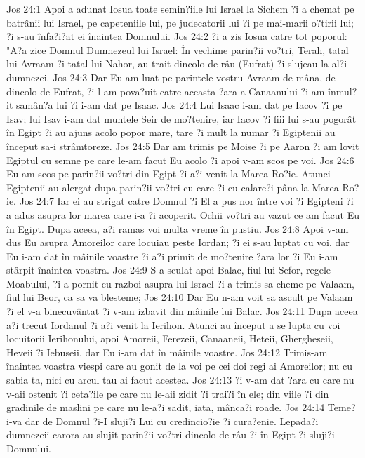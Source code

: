 Jos 24:1  Apoi a adunat Iosua toate semin?iile lui Israel la Sichem ?i a chemat pe batrânii lui Israel, pe capeteniile lui, pe judecatorii lui ?i pe mai-marii o?tirii lui; ?i s-au înfa?i?at ei înaintea Domnului.
Jos 24:2  ?i a zis Iosua catre tot poporul: "A?a zice Domnul Dumnezeul lui Israel: În vechime parin?ii vo?tri, Terah, tatal lui Avraam ?i tatal lui Nahor, au trait dincolo de râu (Eufrat) ?i slujeau la al?i dumnezei.
Jos 24:3  Dar Eu am luat pe parintele vostru Avraam de mâna, de dincolo de Eufrat, ?i l-am pova?uit catre aceasta ?ara a Canaanului ?i am înmul?it samân?a lui ?i i-am dat pe Isaac.
Jos 24:4  Lui Isaac i-am dat pe Iacov ?i pe Isav; lui Isav i-am dat muntele Seir de mo?tenire, iar Iacov ?i fiii lui s-au pogorât în Egipt ?i au ajuns acolo popor mare, tare ?i mult la numar ?i Egiptenii au început sa-i strâmtoreze.
Jos 24:5  Dar am trimis pe Moise ?i pe Aaron ?i am lovit Egiptul cu semne pe care le-am facut Eu acolo ?i apoi v-am scos pe voi.
Jos 24:6  Eu am scos pe parin?ii vo?tri din Egipt ?i a?i venit la Marea Ro?ie. Atunci Egiptenii au alergat dupa parin?ii vo?tri cu care ?i cu calare?i pâna la Marea Ro?ie.
Jos 24:7  Iar ei au strigat catre Domnul ?i El a pus nor între voi ?i Egipteni ?i a adus asupra lor marea care i-a ?i acoperit. Ochii vo?tri au vazut ce am facut Eu în Egipt. Dupa aceea, a?i ramas voi multa vreme în pustiu.
Jos 24:8  Apoi v-am dus Eu asupra Amoreilor care locuiau peste Iordan; ?i ei s-au luptat cu voi, dar Eu i-am dat în mâinile voastre ?i a?i primit de mo?tenire ?ara lor ?i Eu i-am stârpit înaintea voastra.
Jos 24:9  S-a sculat apoi Balac, fiul lui Sefor, regele Moabului, ?i a pornit cu razboi asupra lui Israel ?i a trimis sa cheme pe Valaam, fiul lui Beor, ca sa va blesteme;
Jos 24:10  Dar Eu n-am voit sa ascult pe Valaam ?i el v-a binecuvântat ?i v-am izbavit din mâinile lui Balac.
Jos 24:11  Dupa aceea a?i trecut Iordanul ?i a?i venit la Ierihon. Atunci au început a se lupta cu voi locuitorii Ierihonului, apoi Amoreii, Ferezeii, Canaaneii, Heteii, Ghergheseii, Heveii ?i Iebuseii, dar Eu i-am dat în mâinile voastre.
Jos 24:12  Trimis-am înaintea voastra viespi care au gonit de la voi pe cei doi regi ai Amoreilor; nu cu sabia ta, nici cu arcul tau ai facut acestea.
Jos 24:13  ?i v-am dat ?ara cu care nu v-aii ostenit ?i ceta?ile pe care nu le-aii zidit ?i trai?i în ele; din viile ?i din gradinile de maslini pe care nu le-a?i sadit, iata, mânca?i roade.
Jos 24:14  Teme?i-va dar de Domnul ?i-I sluji?i Lui cu credincio?ie ?i cura?enie. Lepada?i dumnezeii carora au slujit parin?ii vo?tri dincolo de râu ?i în Egipt ?i sluji?i Domnului.
